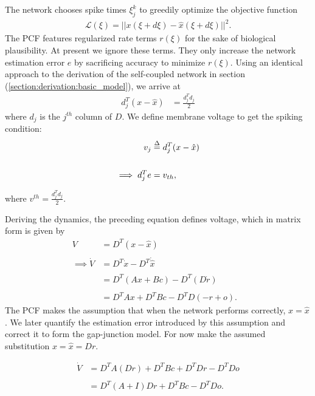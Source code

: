 \begin{enumerate}
The network chooses spike times $\xi_j^k$ to greedily optimize the objective function
\begin{align*}
\mathcal{L}(\xi) = ||x(\xi + d\xi) - \hat{x}(\xi + d\xi)||^2.
\end{align*}
The PCF features regularized rate terms $r(\xi)$ for the sake of biological plausibility. At present we ignore these terms. They only increase the network estimation error $e$ by sacrificing accuracy to minimize $r(\xi)$. 
Using an identical approach to the derivation of the self-coupled network in section (\ref{section:derivation:basic_model}), we arrive at 
\begin{align*}
d_j^T 
\left(
	x - \hat{x}
\right)
&= 
\frac{d_j^T d_j}{2}
\end{align*}
where $d_j$ is the $j^{th}$ column of $D$. We define membrane voltage to get the spiking condition:
\begin{align}
\label{eq:analysis:comparison_sc_vs_pcf_vs_gj:pcf_voltage_def}
v_j &\overset{\Delta}{=} d_j^T (x - \hat{x}) 
\notag
\\
\\
\notag
\implies
d_j^T e &= v_{th}, 
\end{align}

where $v^{th} = \frac{d_j^T d_j}{2}$.

Deriving the dynamics, the preceding equation defines voltage, which in matrix form is given by
\begin{align*}
V &= D^T 
\left(
	x - \hat{x}
\right)
%
\\
\\
%
\implies
\dot{V}
&= 
D^T \dot{x} - D^T \dot{\hat{x}}
&
\\
\\
%
&= D^T 
\left(
	A x + B c
\right)
 - D^T 
 \left(
 D \dot{r}
 \right)
 \\
 \\
 &= 
 D^T A x
 + D^T B c
 - D^T D
\left(
	-r + o 
\right) 
 .
\end{align*}
The PCF makes the assumption that when the network performs correctly, $x = \hat{x}$. We later quantify the estimation error introduced by this assumption and correct it to form the gap-junction model. For now make the assumed substitution $x = \hat{x} = Dr$. 

\begin{align*}
\dot{V} &= D^T A \left(D r\right) + D^T B c + D^T D r - D^T D o
%
\\
\\
%
&= 
D^T
\left(
	A + I 
\right)
 D r
+
D^T B c 
- D^T D o. 
\end{align*}


\end{enumerate}
